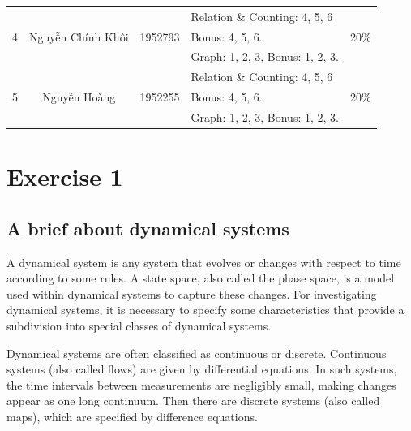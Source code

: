\documentclass[a4paper]{article}
\begin{document}
\begin{center}
\begin{tabular}{|c|c|c|l|c|}
    \hline
    \multirow{3}{*}{4} & \multirow{3}{*}{Nguyễn Chính Khôi}     & \multirow{3}{*}{1952793} & \textendash{} Relation \& Counting: 4, 5, 6   & \multirow{3}{*}{20\%}       \\
                       &                                        &                          & Bonus: 4, 5, 6.                               &                             \\
                       &                                        &                          & \textendash{} Graph: 1, 2, 3, Bonus: 1, 2, 3. &                             \\
    \hline
    \multirow{3}{*}{5} & \multirow{3}{*}{Nguyễn Hoàng}          & \multirow{3}{*}{1952255} & \textendash{} Relation \& Counting: 4, 5, 6   & \multirow{3}{*}{20\%}       \\
                       &                                        &                          & Bonus: 4, 5, 6.                               &                             \\
                       &                                        &                          & \textendash{} Graph: 1, 2, 3, Bonus: 1, 2, 3. &                             \\
    \hline
  \end{tabular}
\end{center}


\newpage
\section{Exercise 1}
\subsection{A brief about dynamical systems}
A dynamical system is any system that evolves or changes with respect to time according to some rules.
A state space, also called the phase space, is a model used within dynamical systems to capture these changes.
For investigating dynamical systems, it is necessary to specify some characteristics that provide a subdivision into special classes of dynamical systems.

Dynamical systems are often classified as continuous or discrete.
Continuous systems (also called flows) are given by differential equations.
In such systems, the time intervals between measurements are negligibly small, making changes appear as one long continuum.
Then there are discrete systems (also called maps), which are specified by difference equations.
\end{document}
